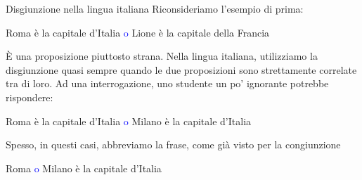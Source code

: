 \documentclass[aspectratio=169,10pt]{beamer}
\newcommand{\conn}[1]{\textcolor{blue}{#1}}
\begin{document}

\begin{frame}{Disgiunzione nella lingua italiana}
    Riconsideriamo l'esempio di prima:\\
    \begin{example}
    Roma è la capitale d'Italia \conn{o} Lione è la capitale della Francia
    \end{example}
    È una proposizione piuttosto strana. Nella lingua italiana, utilizziamo la disgiunzione quasi sempre quando le due proposizioni sono strettamente correlate tra di loro. Ad una interrogazione, uno studente un po' ignorante potrebbe rispondere:
    \begin{example}
    Roma è la capitale d'Italia \conn{o} Milano è la capitale d'Italia
    \end{example}
    Spesso, in questi casi, abbreviamo la frase, come già visto per la congiunzione
    \begin{example}
    Roma \conn{o} Milano è la capitale d'Italia
    \end{example}
\end{frame}
\end{document}
